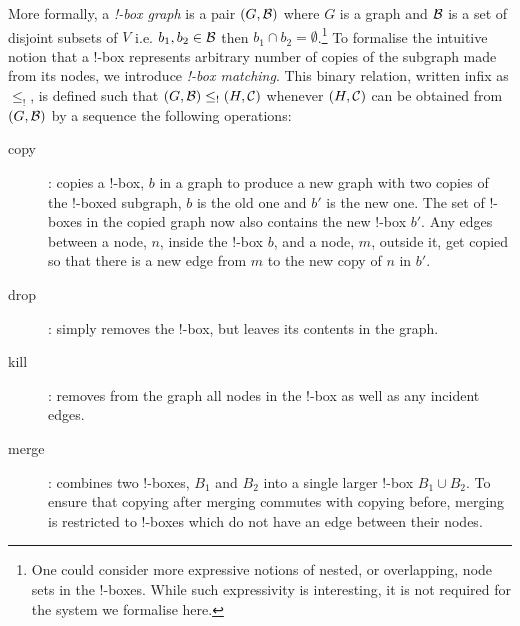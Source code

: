 \documentclass[runningheads]{llncs}
\newcommand{\inlinegraphic}[2]{
  \dimendef\grafheight=255\dimendef\grafvshift=254
  \grafheight=#1
  \grafvshift=-0.5\grafheight
  \advance\grafvshift by 0.5ex
  \raisebox{\grafvshift}{\texttt{[image: images/\#2]}\xspace}
}
\begin{document}

More formally, a \emph{!-box graph} is a pair $(G, {\cal B})$ where
$G$ is a graph and $\cal B$ is a set of disjoint subsets of $V$ i.e.
$b_1, b_2 \in {\cal B}$ then $b_1 \cap b_2 =\emptyset$.\footnote{One
  could consider more expressive notions of nested, or overlapping,
  node sets in the !-boxes. While such expressivity is interesting, it
  is not required for the system we formalise here.}
To formalise the intuitive notion that a !-box represents arbitrary
number of copies of the subgraph made from its nodes, we introduce
\emph{!-box matching}.   This binary relation, written infix as
$\leq_!$, is defined such that 
$(G,{\cal B}) \leq_! (H, {\cal C})$ whenever $(H, {\cal C})$ can be
obtained from $(G,{\cal B})$ by a sequence the following operations:

%
\begin{description}
\item[copy]: copies a !-box, $b$ in a graph to produce a new graph
  with two copies of the !-boxed subgraph, $b$ is the old one and $b'$
  is the new one. The set of !-boxes in the copied graph now also
  contains the new !-box $b'$. Any edges between a node, $n$, inside
  the !-box $b$, and a node, $m$, outside it, get copied so that there
  is a new edge from $m$ to the new copy of $n$ in $b'$. 

\item[drop]: simply removes the !-box, but leaves its contents in the
  graph.

\item[kill]: removes from the graph all nodes in the !-box as well as
  any incident edges.

\item[merge]: combines two !-boxes, $B_1$ and $B_2$ into a single
  larger !-box $B_1 \cup B_2$. To ensure that copying after merging
  commutes with copying before, merging is restricted to !-boxes which
  do not have an edge between their nodes. 
\end{description}
\end{document}

